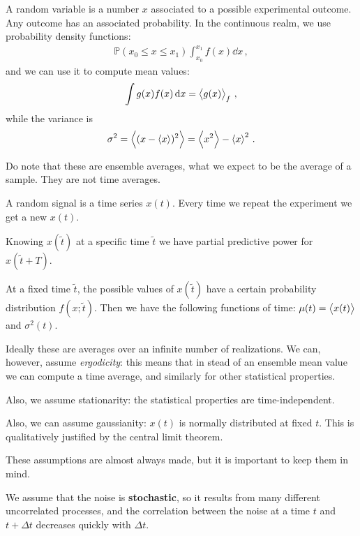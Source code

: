 \documentclass[main.tex]{subfiles}
\begin{document}
A random variable is a number \(x\) associated to a possible experimental outcome. Any outcome has an associated probability.
In the continuous realm, we use probability density functions: 
%
\begin{align}
\mathbb{P} (x_0 \leq x \leq x_1 ) \int_{x_0 }^{x_1 } f(x) \dd{x}
\,,
\end{align}
%
and we can use it to compute mean values: 
%
\begin{align}
\int g(x) f(x) \dd{x} = \expval{g(x)}_{f}
\,,
\end{align}
%
while the variance is 
%
\begin{align}
\sigma^2  = \expval{(x - \expval{x})^2} = \expval{x^2} - \expval{x}^2
\,.
\end{align}

Do note that these are ensemble averages, what we expect to be the average of a sample. They are not time averages. 

A random signal is a time series \(x(t)\).
Every time we repeat the experiment we get a new \(x(t)\). 

Knowing \(x(\widetilde{t})\) at a specific time \(\widetilde{t}\) we have partial predictive power for \(x(\widetilde{t} + T)\). 

At a fixed time \(\widetilde{t}\), the possible values of \(x(\widetilde{t})\) have a certain probability distribution \(f(x; \widetilde{t})\). Then we have the following functions of time: \(\mu (t) = \expval{x(t)}\) and \(\sigma^2(t)\). 

Ideally these are averages over an infinite number of realizations. We can, however, assume \emph{ergodicity}: this means that in stead of an ensemble mean value we can compute a time average, and similarly for other statistical properties. 

Also, we assume stationarity: the statistical properties are time-independent. 

Also, we can assume gaussianity: \(x(t)\) is normally distributed at fixed \(t\). 
This is qualitatively justified by the central limit theorem. 

These assumptions are almost always made, but it is important to keep them in mind.

We assume that the noise is \textbf{stochastic}, so it results from many different uncorrelated processes, and the correlation between the noise at a time \(t\) and \(t + \Delta t\) decreases quickly with \(\Delta t\). 

\end{document}
